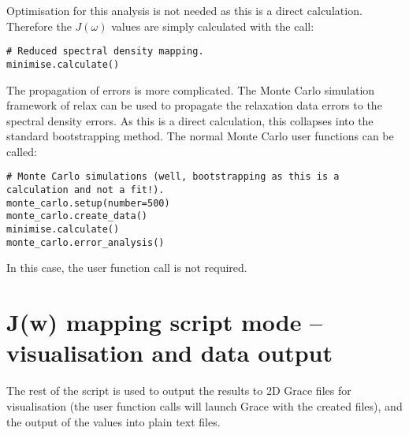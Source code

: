 Optimisation for this analysis is not needed as this is a direct calculation.
Therefore the $J(\omega)$ values are simply calculated with the call:

\begin{lstlisting}[firstnumber=31]
# Reduced spectral density mapping.
minimise.calculate()
\end{lstlisting}

The propagation of errors is more complicated.
The Monte Carlo simulation framework of relax can be used to propagate the relaxation data errors to the spectral density errors.
As this is a direct calculation, this collapses into the standard bootstrapping method.
The normal Monte Carlo user functions can be called:

\begin{lstlisting}[firstnumber=34]
# Monte Carlo simulations (well, bootstrapping as this is a calculation and not a fit!).
monte_carlo.setup(number=500)
monte_carlo.create_data()
minimise.calculate()
monte_carlo.error_analysis()
\end{lstlisting}

In this case, the  user function call is not required.



\section{J(w) mapping script mode -- visualisation and data output}

The rest of the script is used to output the results to 2D Grace files for visualisation (the  user function calls will launch Grace with the created files), and the output of the values into plain text files.
